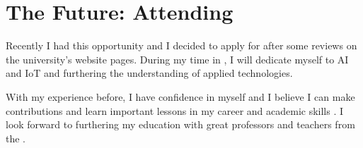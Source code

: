\section*{The Future: Attending {\schoolLong}}
Recently I had this opportunity and I decided to apply for {\schoolShort} after some reviews on the university’s website pages. During my time in {\schoolShort}, I will dedicate myself to AI and IoT and furthering the understanding of applied technologies. 

With my experience before, I have confidence in myself and I believe I can make contributions and learn important lessons in my career and academic skills . I look forward to furthering my education with great professors and teachers from the {\schoolLong}.
